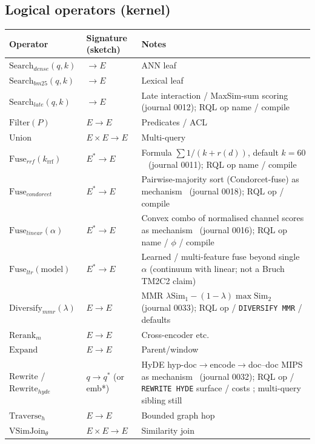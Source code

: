 \subsection{Logical operators (kernel)}
\begin{center}
\begin{tabular}{@{}llp{}@{}}
\toprule
Operator & Signature (sketch) & Notes \\
\midrule
$\mathrm{Search}_{dense}(q,k)$ & $\rightarrow E$ & ANN leaf \\
$\mathrm{Search}_{bm25}(q,k)$ & $\rightarrow E$ & Lexical leaf \\
$\mathrm{Search}_{late}(q,k)$ & $\rightarrow E$ & Late interaction / MaxSim-sum scoring \established{}~\citep{khattab2020colbert} (journal 0012); RQL op name / compile \hypothesis{} \\
$\mathrm{Filter}(P)$ & $E\rightarrow E$ & Predicates / ACL \\
$\mathrm{Union}$ & $E\times E\rightarrow E$ & Multi-query \\
$\mathrm{Fuse}_{rrf}(k_{\mathrm{rrf}})$ & $E^*\rightarrow E$ & Formula \(\sum 1/(k+r(d))\), default \(k{=}60\) \established{}~\citep{cormack2009rrf} (journal 0011); RQL op name / compile \hypothesis{} \\
$\mathrm{Fuse}_{condorcet}$ & $E^*\rightarrow E$ & Pairwise-majority sort (Condorcet-fuse) \established{} as mechanism~\citep{montague2002condorcet} (journal 0018); RQL op / compile \hypothesis{} \\
$\mathrm{Fuse}_{linear}(\alpha)$ & $E^*\rightarrow E$ & Convex combo of normalised channel scores \established{} as mechanism~\citep{bruch2023fusion} (journal 0016); RQL op name / \(\phi\) / compile \hypothesis{} \\
$\mathrm{Fuse}_{ltr}(\mathrm{model})$ & $E^*\rightarrow E$ & Learned / multi-feature fuse beyond single \(\alpha\) \hypothesis{} (continuum with linear; not a Bruch TM2C2 claim) \\
$\mathrm{Diversify}_{mmr}(\lambda)$ & $E\rightarrow E$ & MMR $\lambda\mathrm{Sim}_1-(1-\lambda)\max\mathrm{Sim}_2$ \established{}~\citep{carbonell1998mmr} (journal 0033); RQL op / \texttt{DIVERSIFY MMR} / defaults \hypothesis{} \\
$\mathrm{Rerank}_{m}$ & $E\rightarrow E$ & Cross-encoder etc. \\
$\mathrm{Expand}$ & $E\rightarrow E$ & Parent/window \\
$\mathrm{Rewrite}$ / $\mathrm{Rewrite}_{hyde}$ & $q\rightarrow q^*$ (or emb*) & HyDE hyp-doc$\rightarrow$encode$\rightarrow$doc--doc MIPS \established{} as mechanism~\citep{gao2023hyde} (journal 0032); RQL op / \texttt{REWRITE HYDE} surface / costs \hypothesis{}; multi-query sibling still \provisional{} \\
$\mathrm{Traverse}_{h}$ & $E\rightarrow E$ & Bounded graph hop \\
$\mathrm{VSimJoin}_{\theta}$ & $E\times E\rightarrow E$ & Similarity join \\
\bottomrule
\end{tabular}
\end{center}

